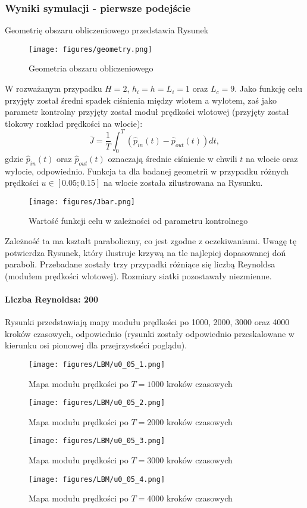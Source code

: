 \documentclass[12pt]{article}
\begin{document}
\subsubsection{Wyniki symulacji - pierwsze podejście}
Geometrię obszaru obliczeniowego przedstawia Rysunek
\begin{figure}[H]
	\texttt{[image: figures/geometry.png]} 
	\centering
	\caption{Geometria obszaru obliczeniowego}
\end{figure}
W rozważanym przypadku $ H = 2 $, $ h_{i}=h=L_{i}=1 $ oraz $ L_{c}=9 $.\newline
Jako funkcję celu przyjęty został średni spadek ciśnienia między wlotem a wylotem, zaś jako parametr kontrolny przyjęty został moduł prędkości wlotowej (przyjęty został tłokowy rozkład prędkości na wlocie):
\begin{equation}
\bar{J} = \frac{1}{T}\int_{0}^{T}(\hat{p}_{in}(t)-\hat{p}_{out}(t))dt,
\end{equation}
gdzie $ \hat{p}_{in}(t) $ oraz $ \hat{p}_{out}(t) $ oznaczają średnie ciśnienie w chwili $ t $ na wlocie oraz wylocie, odpowiednio. Funkcja ta dla badanej geometrii w przypadku różnych prędkości $ u \in [0.05 ; 0.15]$ na wlocie została zilustrowana na Rysunku.
\begin{figure}[H]
	\texttt{[image: figures/Jbar.png]} 
	\centering
	\caption{Wartość funkcji celu w zależności od parametru kontrolnego}
\end{figure}
Zależność ta ma kształt paraboliczny, co jest zgodne z oczekiwaniami. Uwagę tę potwierdza Rysunek, który ilustruje krzywą na tle najlepiej dopasowanej doń paraboli.
Przebadane zostały trzy przypadki różniące się liczbą Reynoldsa (modułem prędkości wlotowej). Rozmiary siatki pozostawały niezmienne.
\paragraph{Liczba Reynoldsa: 200}
Rysunki przedstawiają mapy modułu prędkości po 1000, 2000, 3000 oraz 4000 kroków czasowych, odpowiednio (rysunki zostały odpowiednio przeskalowane w kierunku osi pionowej dla przejrzystości poglądu).
\begin{figure}[H]
	\texttt{[image: figures/LBM/u0\_05\_1.png]} 
	\caption{Mapa modułu prędkości po $ T=1000 $ kroków czasowych}
\end{figure}
\begin{figure}[H]
	\texttt{[image: figures/LBM/u0\_05\_2.png]} 
	\caption{Mapa modułu prędkości po $ T=2000 $ kroków czasowych}
\end{figure}
\begin{figure}[H]
	\texttt{[image: figures/LBM/u0\_05\_3.png]} 
	\caption{Mapa modułu prędkości po $ T=3000 $ kroków czasowych}
\end{figure}
\begin{figure}[H]
	\texttt{[image: figures/LBM/u0\_05\_4.png]} 
	\caption{Mapa modułu prędkości po $ T=4000 $ kroków czasowych}
\end{figure}
\end{document}
